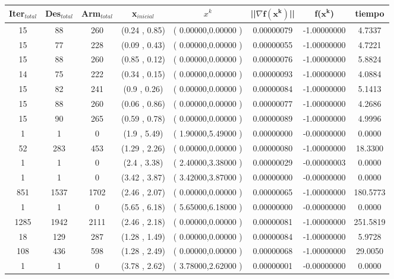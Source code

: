 \begin{itemize}
\begin{table}[H]
\centering
\renewcommand{\arraystretch}{1.2} 
\begin{tabular}{|c|c|c|c|c|c|c|c|}
\hline
\textbf{Iter$_{total}$} &\textbf{Des$_{total}$}&\textbf{Arm$_{total}$} & \textbf{x$_{inicial}$}& \textbf{$x^k$} & \textbf{||$\nabla \mathbf{f(x^k)}$}|| & \textbf{f($\mathbf{x^k}$)} & \textbf{tiempo} \\
\hline
15  & 88 &260 & (0.24 , 0.85) &( 0.00000,0.00000 ) & 0.00000079 & -1.00000000 & 4.7337 \\
15  & 77 &228 & (0.09 , 0.43) &( 0.00000,0.00000 ) & 0.00000055 & -1.00000000 & 4.7221 \\
15  & 88 &260 & (0.85 , 0.12) &( 0.00000,0.00000 ) & 0.00000076 & -1.00000000 & 5.8824 \\
14  & 75 &222 & (0.34 , 0.15) &( 0.00000,0.00000 ) & 0.00000093 & -1.00000000 & 4.0884 \\
15  & 82 &241 & (0.9 , 0.26) &( 0.00000,0.00000 ) & 0.00000084 & -1.00000000 & 5.1413 \\
15  & 88 &260 & (0.06 , 0.86) &( 0.00000,0.00000 ) & 0.00000077 & -1.00000000 & 4.2686 \\
15  & 90 &265 & (0.59 , 0.78) &( 0.00000,0.00000 ) & 0.00000089 & -1.00000000 & 4.9996 \\
1  & 1 &0 & (1.9 , 5.49) &( 1.90000,5.49000 ) & 0.00000000 & -0.00000000 & 0.0000 \\
52  & 283 &453 & (1.29 , 2.26) &( 0.00000,0.00000 ) & 0.00000080 & -1.00000000 & 18.3300 \\
1  & 1 &0 & (2.4 , 3.38) &( 2.40000,3.38000 ) & 0.00000029 & -0.00000003 & 0.0000 \\
1  & 1 &0 & (3.42 , 3.87) &( 3.42000,3.87000 ) & 0.00000000 & -0.00000000 & 0.0000 \\
851  & 1537 &1702 & (2.46 , 2.07) &( 0.00000,0.00000 ) & 0.00000065 & -1.00000000 & 180.5773 \\
1  & 1 &0 & (5.65 , 6.18) &( 5.65000,6.18000 ) & 0.00000000 & -0.00000000 & 0.0000 \\
1285  & 1942 &2111 & (2.46 , 2.18) &( 0.00000,0.00000 ) & 0.00000081 & -1.00000000 & 251.5819 \\
18  & 129 &287 & (1.28 , 1.49) &( 0.00000,0.00000 ) & 0.00000084 & -1.00000000 & 5.9728 \\
108  & 436 &598 & (1.28 , 2.49) &( 0.00000,0.00000 ) & 0.00000068 & -1.00000000 & 29.0050 \\
1  & 1 &0 & (3.78 , 2.62) &( 3.78000,2.62000 ) & 0.00000001 & -0.00000000 & 0.0000 \\
\hline
\end{tabular}
\end{table}


\end{itemize}
